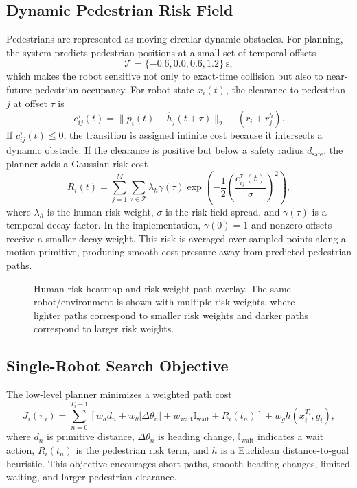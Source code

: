 \documentclass[10pt,twocolumn,letterpaper]{article}
\begin{document}
\subsection{Dynamic Pedestrian Risk Field}
Pedestrians are represented as moving circular dynamic obstacles. For planning, the system predicts pedestrian positions at a small set of temporal offsets
\begin{equation}
    \mathcal{T} = \{-0.6, 0.0, 0.6, 1.2\} \ \mathrm{s},
\end{equation}
which makes the robot sensitive not only to exact-time collision but also to near-future pedestrian occupancy. For robot state $x_i(t)$, the clearance to pedestrian $j$ at offset $\tau$ is
\begin{equation}
    c_{ij}^{\tau}(t) =
    \|p_i(t)-\hat{h}_j(t+\tau)\|_2 - (r_i+r^h_j).
\end{equation}
If $c_{ij}^{\tau}(t) \leq 0$, the transition is assigned infinite cost because it intersects a dynamic obstacle. If the clearance is positive but below a safety radius $d_{\mathrm{safe}}$, the planner adds a Gaussian risk cost
\begin{equation}
    R_i(t) =
    \sum_{j=1}^{M}\sum_{\tau\in\mathcal{T}}
    \lambda_h \gamma(\tau)
    \exp\left(
    -\frac{1}{2}\left(\frac{c_{ij}^{\tau}(t)}{\sigma}\right)^2
    \right),
\end{equation}
where $\lambda_h$ is the human-risk weight, $\sigma$ is the risk-field spread, and $\gamma(\tau)$ is a temporal decay factor. In the implementation, $\gamma(0)=1$ and nonzero offsets receive a smaller decay weight. This risk is averaged over sampled points along a motion primitive, producing smooth cost pressure away from predicted pedestrian paths.

\begin{figure}[t]
    \centering
    \caption{Human-risk heatmap and risk-weight path overlay. The same robot/environment is shown with multiple risk weights, where lighter paths correspond to smaller risk weights and darker paths correspond to larger risk weights.}
    \label{fig:risk_overlay}
\end{figure}

\subsection{Single-Robot Search Objective}
The low-level planner minimizes a weighted path cost
\begin{equation}
    J_i(\pi_i) =
    \sum_{n=0}^{T_i-1}
    \left[
    w_d d_n + w_{\theta}|\Delta \theta_n|
    + w_{\mathrm{wait}}\mathbb{I}_{\mathrm{wait}}
    + R_i(t_n)
    \right]
    + w_g h(x_i^{T_i}, g_i),
\end{equation}
where $d_n$ is primitive distance, $\Delta\theta_n$ is heading change, $\mathbb{I}_{\mathrm{wait}}$ indicates a wait action, $R_i(t_n)$ is the pedestrian risk term, and $h$ is a Euclidean distance-to-goal heuristic. This objective encourages short paths, smooth heading changes, limited waiting, and larger pedestrian clearance.
\end{document}
